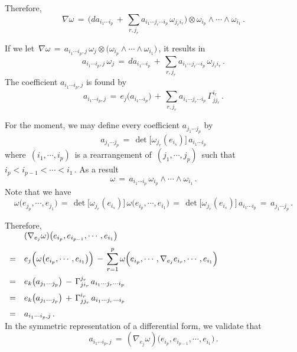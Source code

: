 \documentclass{article}[12pt,a4paper]
\begin{document}
Therefore, 
\begin{equation}
	\nabla\omega \,=\, \Big(da_{i_1\cdots i_p} \,+\, \sum_{r, j_r} a_{i_1\cdots j_r\cdots i_p} \, \omega_{j_r i_r}\Big)
	\otimes \omega_{i_p}\wedge \cdots \wedge \omega_{i_1}\,.
\end{equation}
\vspace*{0.1in}

If we let \,$\nabla \omega \,=\, a_{i_1\cdots i_p,j}\,\omega_j 
	\otimes \big(\omega_{i_p} \wedge \cdots \wedge \omega_{i_1}\big) $\,,
it results in
$$ a_{i_1 \cdots i_p,j}\, \omega_j \,=\, da_{i_1\cdots i_p} \,+\, \sum_{r, j_r} a_{i_1\cdots j_r\cdots i_p} \, \omega_{j_r i_r}\,. $$
The coefficient $a_{i_1\cdots i_p,j}$ is found by
$$ a_{i_1\cdots i_p, j} \,=\, e_j\big(a_{i_1\cdots i_p}\big) \,+\, \sum_{r, j_r} a_{i_1\cdots j_r\cdots i_p} \, \Gamma_{jj_r}^{i_r}\,. $$
\vspace*{0.1in}

For the moment, we may define every coefficient $a_{j_1\cdots j_p}$ by
$$ a_{j_1\cdots j_p} \,=\, \det\Big[\omega_{j_r}(e_{i_s})\Big] \, a_{i_1\cdots i_p} $$
where \,$(i_1,\cdots,i_p)$\, is a rearrangement of \,$(j_1,\cdots,j_p)$\, such that
\,$i_p<i_{p-1}<\cdots<i_1$\,. As a result
$$  \omega \,=\, a_{i_1\cdots i_p}\, \omega_{i_p}\wedge\cdots\wedge\omega_{i_1}\,.$$
Note that we have
$$ \omega\big(e_{j_p}, \cdots, e_{j_1}\big) \,=\, \det\Big[\omega_{j_r}(e_{i_s})\Big]\, \omega\big(e_{i_p},\cdots, e_{i_1}\big)
\,=\, \det\Big[\omega_{j_r}(e_{i_s})\Big]\, a_{i_1\cdots i_p} \,=\, a_{j_1\cdots j_p}\,. $$

Therefore, \\[0.1in]
$\begin{array}{rl}
&\displaystyle (\nabla_{e_j}\omega)\big(e_{i_p}, e_{i_{p-1}}, \cdots, e_{i_1}\big) \\[0.1in]
=&\displaystyle 
	e_j\Big(\omega\big(e_{i_p}, \cdots, e_{i_1}\big) \Big) \,-\,
	\sum_{r=1}^p \omega\Big(e_{i_p},\cdots, \nabla_{e_j}e_{i_r}, \cdots, e_{i_1}\Big) \\[0.2in]
=& \displaystyle 
	e_k\big( a_{j_1\cdots j_p}\big) \,-\, \Gamma_{ji_r}^{j_r}\, a_{i_1\cdots j_r \cdots i_p} \\[0.1in]
=& \displaystyle 
	e_k\big( a_{j_1\cdots j_p}\big) \,+\, \Gamma_{jj_r}^{i_r}\, a_{i_1\cdots j_r \cdots i_p} \\[0.1in]
=& \displaystyle 
	a_{i_1\cdots i_p, j} \,.
\end{array}$ \\[0.1in]
In the symmetric representation of a differential form, we validate that 
$$ a_{i_1\cdots i_p, j} \,=\, (\nabla_{e_j}\omega)\big(e_{i_p}, e_{i_{p-1}}, \cdots, e_{i_1}\big)\,. $$
\end{document}
